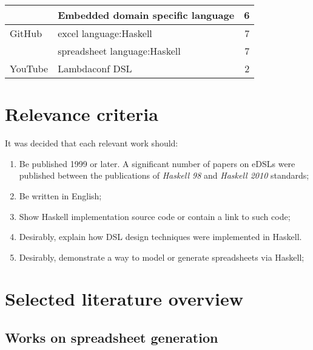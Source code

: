 \begin{longtable}{|l|l|r|}
                                   & Embedded domain specific language         &
    6                                                                                                     \\
    \hline
    GitHub
                                   & excel language:Haskell                    & 7                        \\
                                   & spreadsheet language:Haskell              & 7                        \\
    \hline
    YouTube
                                   & Lambdaconf DSL                            & 2                        \\
    \hline
\end{longtable}

\section{Relevance criteria} \label {sec:relevance}

It was decided that each relevant work should:

\begin{enumerate}[noitemsep, label=\arabic*) ]
    \item Be published 1999 or later. A significant number of papers on eDSLs were published between the publications of \textit{Haskell 98} and \textit{Haskell 2010} standards;
    \item Be written in English;
    \item Show Haskell implementation source code or contain a link to such code;
    \item Desirably, explain how DSL design techniques were implemented in Haskell.
    \item Desirably, demonstrate a way to model or generate spreadsheets via Haskell;
\end{enumerate}

\section{Selected literature overview} \label{sec:selectedLiterature}

\subsection{Works on spreadsheet generation}

